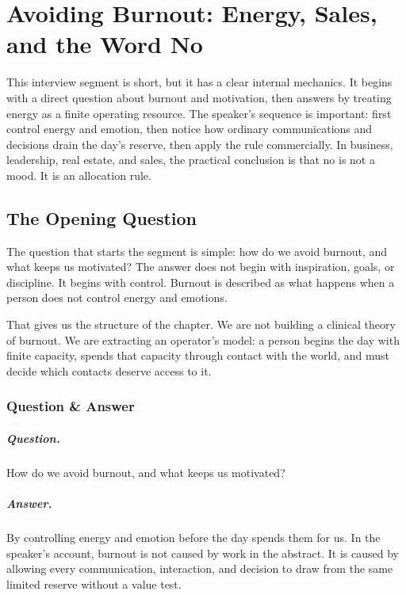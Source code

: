 \chapter{Avoiding Burnout: Energy, Sales, and the Word No}

This interview segment is short, but it has a clear internal mechanics. It begins with a direct question about burnout and motivation, then answers by treating energy as a finite operating resource. The speaker's sequence is important: first control energy and emotion, then notice how ordinary communications and decisions drain the day's reserve, then apply the rule commercially. In business, leadership, real estate, and sales, the practical conclusion is that no is not a mood. It is an allocation rule.

\section{The Opening Question}

The question that starts the segment is simple: how do we avoid burnout, and what keeps us motivated? The answer does not begin with inspiration, goals, or discipline. It begins with control. Burnout is described as what happens when a person does not control energy and emotions.

That gives us the structure of the chapter. We are not building a clinical theory of burnout. We are extracting an operator's model: a person begins the day with finite capacity, spends that capacity through contact with the world, and must decide which contacts deserve access to it.

\subsection{Question \& Answer}

\paragraph{Question.}
How do we avoid burnout, and what keeps us motivated?

\paragraph{Answer.}
By controlling energy and emotion before the day spends them for us. In the speaker's account, burnout is not caused by work in the abstract. It is caused by allowing every communication, interaction, and decision to draw from the same limited reserve without a value test.

